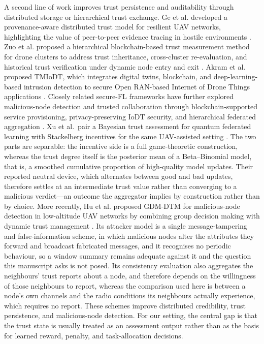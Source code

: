 \documentclass[notspecified,article,submit,moreauthors]{Definitions/mdpi}
\begin{document}
A second line of work improves trust persistence and auditability through distributed storage or hierarchical trust exchange. Ge et al. developed a provenance-aware distributed trust model for resilient UAV networks, highlighting the value of peer-to-peer evidence tracing in hostile environments \cite{ge2021uavpro}. Zuo et al. proposed a hierarchical blockchain-based trust measurement method for drone clusters to address trust inheritance, cross-cluster re-evaluation, and historical trust verification under dynamic node entry and exit \cite{zuo2023blockchain}. Akram et al. proposed TMIoDT, which integrates digital twins, blockchain, and deep-learning-based intrusion detection to secure Open RAN-based Internet of Drone Things applications \cite{akram2024tmiodt}. Closely related secure-FL frameworks have further explored malicious-node detection and trusted collaboration through blockchain-supported service provisioning, privacy-preserving IoDT security, and hierarchical federated aggregation \cite{abubaker2022blockchained,akram2023chained,zheng2024tinyfl,tong2024hierarchicalfl}. Xu et al.\ pair a Bayesian trust assessment for quantum federated learning with Stackelberg incentives for the same UAV-assisted setting \cite{trustgame_qfl_uav}. The two parts are separable: the incentive side is a full game-theoretic construction, whereas the trust degree itself is the posterior mean of a Beta--Binomial model, that is, a smoothed cumulative proportion of high-quality model updates. Their reported neutral device, which alternates between good and bad updates, therefore settles at an intermediate trust value rather than converging to a malicious verdict---an outcome the aggregator implies by construction rather than by choice. More recently, Hu et al. proposed GDM-DTM for malicious-node detection in low-altitude UAV networks by combining group decision making with dynamic trust management \cite{hu2025gdm}. Its attacker model is a single message-tampering and false-information scheme, in which malicious nodes alter the attributes they forward and broadcast fabricated messages, and it recognises no periodic behaviour, so a window summary remains adequate against it and the question this manuscript asks is not posed. Its consistency evaluation also aggregates the neighbours' trust reports about a node, and therefore depends on the willingness of those neighbours to report, whereas the comparison used here is between a node's own channels and the radio conditions its neighbours actually experience, which requires no report. These schemes improve distributed credibility, trust persistence, and malicious-node detection. For our setting, the central gap is that the trust state is usually treated as an assessment output rather than as the basis for learned reward, penalty, and task-allocation decisions.
\end{document}
